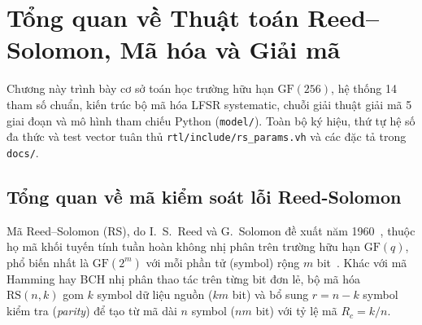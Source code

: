 \documentclass[11pt,a4paper]{report}
\begin{document}
\begingroup
\let\clearpage\relax
\footnotesize
\linespread{1.02}\selectfont
\setlength{\parskip}{0pt}
\titlespacing*{\chapter}{0pt}{4pt}{4pt}
\tableofcontents
\vspace{0.35em}
\listoftables
\vspace{0.35em}
\listoffigures
\endgroup

\clearpage
{}

\chapter{Tổng quan về Thuật toán Reed--Solomon, Mã hóa và Giải mã}

Chương này trình bày cơ sở toán học trường hữu hạn $\text{GF}(256)$, hệ thống 14 tham số chuẩn, kiến trúc bộ mã hóa LFSR systematic, chuỗi giải thuật giải mã 5 giai đoạn và mô hình tham chiếu Python (\texttt{model/}). Toàn bộ ký hiệu, thứ tự hệ số đa thức và test vector tuân thủ \texttt{rtl/include/rs\_params.vh} và các đặc tả trong \texttt{docs/}.

\section{Tổng quan về mã kiểm soát lỗi Reed-Solomon}

Mã Reed--Solomon (RS), do I.~S.~Reed và G.~Solomon đề xuất năm 1960~\cite{reed1960}, thuộc họ mã khối tuyến tính tuần hoàn không nhị phân trên trường hữu hạn $\text{GF}(q)$, phổ biến nhất là $\text{GF}(2^m)$ với mỗi phần tử (symbol) rộng $m$ bit~\cite{lincostello2004,morelos2006}. Khác với mã Hamming hay BCH nhị phân thao tác trên từng bit đơn lẻ, bộ mã hóa $\text{RS}(n, k)$ gom $k$ symbol dữ liệu nguồn ($km$ bit) và bổ sung $r = n - k$ symbol kiểm tra (\textit{parity}) để tạo từ mã dài $n$ symbol ($nm$ bit) với tỷ lệ mã $R_c = k/n$.
\end{document}
